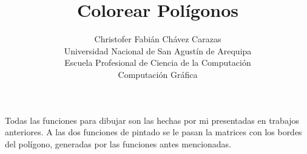 \documentclass[a4paper,12pt]{article}
\begin{document}
\title{Colorear Polígonos}
\author{
Christofer Fabián Chávez Carazas \\
\small{Universidad Nacional de San Agustín de Arequipa} \\
\small{Escuela Profesional de Ciencia de la Computación} \\
\small{Computación Gráfica}
}
\date{}

\maketitle

Todas las funciones para dibujar son las hechas por mi presentadas en trabajos anteriores. A las dos funciones de pintado se le pasan la matrices con los bordes del
 polígono, generadas por las funciones antes mencionadas.
\end{document}
